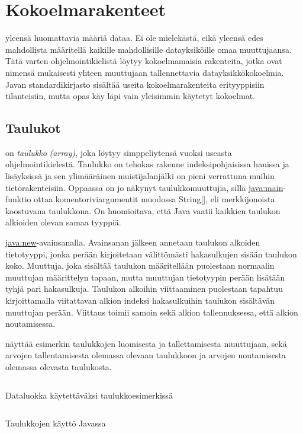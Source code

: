 \documentclass{tufte-book}
\newcommand{\eng}[1]{\textit{(#1)}}
\newcommand{\new}[1]{\textit{\gls{#1}}}
\newcommand{\neweng}[2]{\new{#1} \eng{#2}}
\newcommand{\java}[1]{\underline{\gls{java:#1}}}
\newcommand{\code}[3]{
\begin{listing}
    \inputminted{java}{OhjelmointiopasEsimerkit/src/#1/#2.java}
    \caption{#3}
    \label{Java-#1-#2}
\end{listing}
}
\begin{document}
\section{Kokoelmarakenteet}
\label{kokoelmista}

 yleensä huomattavia määriä dataa. Ei ole mielekästä, eikä
yleensä edes mahdollista määritellä kaikille mahdollisille datayksiköille omaa muuttujaansa.
Tätä varten ohjelmointikielistä löytyy kokoelmamaisia rakenteita, jotka ovat nimensä mukaisesti
yhteen muuttujaan tallennettavia datayksikkökokoelmia. Javan standardikirjasto sisältää useita
kokoelmarakenteita erityyppisiin tilanteisiin, mutta opas käy läpi vain yleisimmin käytetyt
kokoelmat.

\subsection{Taulukot}
\label{taulukot}

 on \neweng{taulukko}{array}, joka löytyy
simppeliytensä vuoksi useasta ohjelmointikielestä. Taulukko on tehokas rakenne indeksipohjaisissa
hauissa ja lisäyksissä ja sen ylimääräinen muistijalanjälki on pieni verrattuna muihin
tietorakenteisiin. Oppaassa on jo näkynyt taulukkomuuttujia, sillä \java{main}-funktio ottaa
komentoriviargumentit muodossa String[], eli merkkijonoista koostuvana taulukkona. On huomioitava,
että Java vaatii kaikkien taulukon alkioiden olevan samaa tyyppiä.

 \java{new}-avainsanalla. Avainsanan jälkeen annetaan taulukon
alkoiden tietotyyppi, jonka perään kirjoitetaan välittömästi hakasulkujen sisään taulukon koko.
Muuttuja, joka sisältää taulukon määritellään puolestaan normaalin muuttujan määrittelyn tapaan,
mutta muuttujan tietotyypin perään lisätään tyhjä pari hakasulkuja. Taulukon alkoihin viittaaminen
puolestaan tapahtuu kirjoittamalla viitattavan alkion indeksi hakasulkuihin taulukon sisältävän
muuttujan perään. Viittaus toimii samoin sekä alkion tallennuksessa, että alkion noutamisessa.

 näyttää esimerkin taulukkojen luomisesta ja tallettamisesta
muuttujaan, sekä arvojen tallentamisesta olemassa olevaan taulukkoon ja arvojen noutamisesta
olemassa olevasta taulukosta.

\code{week3/arrayexample}{DataPoint}{Dataluokka käytettäväksi taulukkoesimerkissä}
\code{week3/arrayexample}{ArrayExample}{Taulukkojen käyttö Javassa}
\end{document}

